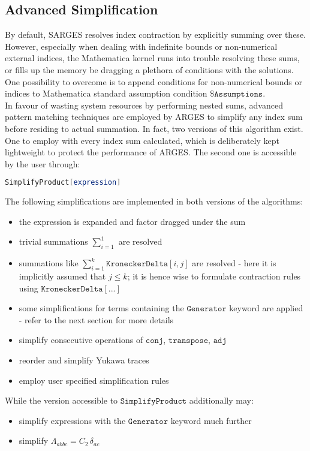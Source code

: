 \documentclass{scrartcl}
\begin{document}
\subsection{Advanced Simplification}
By default, SARGES resolves index contraction by explicitly summing over these. However, especially when dealing with indefinite bounds or non-numerical external indices, the Mathematica kernel runs into trouble resolving these sums, or fills up the memory be dragging a plethora of conditions with the solutions. One possibility to overcome is to append conditions for non-numerical bounds or indices to Mathematica standard assumption condition $\$\mathtt{Assumptions}$. \\ In favour of wasting system resources by performing nested sums, advanced pattern matching techniques are employed by ARGES to simplify any index sum before residing to actual summation. In fact, two versions of this algorithm exist. One to employ with every index sum calculated, which is deliberately kept lightweight to protect the performance of ARGES. The second one is accessible by the user through:
\begin{lstlisting}[language=mathematica,mathescape,columns=flexible,backgroundcolor=\color{light-gray}]
SimplifyProduct[expression]
\end{lstlisting}
The following simplifications are implemented in both versions of the algorithms:
\begin{itemize}
\item the expression is expanded and factor dragged under the sum
\item trivial summations $\sum_{i=1}^1$ are resolved
\item summations like $\sum_{i=1}^{k} \mathtt{KroneckerDelta}[i,j]$ are resolved - here it is implicitly assumed that $j \leq k$; it is hence wise to formulate contraction rules using $\mathtt{KroneckerDelta}[...]$
\item some simplifications for terms containing the $\mathtt{Generator}$ keyword are applied - refer to the next section for more details
\item simplify consecutive operations of $\mathtt{conj}$, $\mathtt{transpose}$, $\mathtt{adj}$
\item reorder and simplify Yukawa traces 
\item employ user specified simplification rules
\end{itemize}
While the version accessible to $\mathtt{SimplifyProduct}$ additionally may:
\begin{itemize}
\item simplify expressions with the $\mathtt{Generator}$ keyword much further
\item simplify $\Lambda_{abbc} = C_2 \,\delta_{ac}$
\end{itemize}
\end{document}
